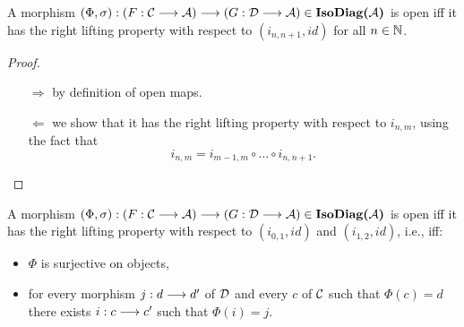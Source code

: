 	\begin{lemme}
		A morphism $(\Phi,\sigma) : (F : \mathcal{C} \longrightarrow \mathcal{A}) \longrightarrow (G : \mathcal{D} \longrightarrow \mathcal{A}) \in \textbf{IsoDiag(}\mathcal{A}\textbf{)}$ is open iff it has the right lifting property with respect to $(i_{n,n+1},id)$ for all $n\in\mathbb{N}$.
	\end{lemme}
	
	\begin{proof}~
		\begin{itemize}
			\item[$\Rightarrow$] by definition of open maps.
			\item[$\Leftarrow$] we show that it has the right lifting property with respect to $i_{n,m}$, using the fact that $$i_{n,m} = i_{m-1,m}\circ \ldots \circ i_{n,n+1}.$$
		\end{itemize}
	\end{proof}
	
	\begin{prop}
		A morphism $(\Phi,\sigma) : (F : \mathcal{C} \longrightarrow \mathcal{A}) \longrightarrow (G : \mathcal{D} \longrightarrow \mathcal{A}) \in \textbf{IsoDiag(}\mathcal{A}\textbf{)}$ is open iff it has the right lifting property with respect to $(i_{0,1},id)$ and $(i_{1,2},id)$, i.e., iff:
		\begin{itemize}
			\item $\Phi$ is surjective on objects,
			\item for every morphism $j : d \longrightarrow d'$ of $\mathcal{D}$ and every $c$ of $\mathcal{C}$ such that $\Phi(c) = d$ there exists $i : c \longrightarrow c'$ such that $\Phi(i) = j$.
		\end{itemize}
	\end{prop}
	

